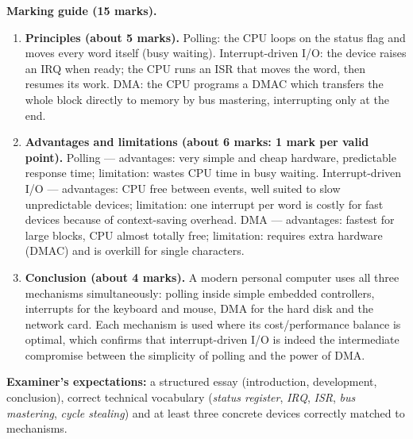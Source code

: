 \documentclass[11pt]{article}
\begin{document}
\begin{corrige}
\textbf{Marking guide (15 marks).}
\begin{enumerate}
\item \textbf{Principles (about 5 marks).} Polling: the CPU loops on the status flag and moves every word itself (busy waiting). Interrupt-driven I/O: the device raises an IRQ when ready; the CPU runs an ISR that moves the word, then resumes its work. DMA: the CPU programs a DMAC which transfers the whole block directly to memory by bus mastering, interrupting only at the end.
\item \textbf{Advantages and limitations (about 6 marks: 1 mark per valid point).} Polling --- advantages: very simple and cheap hardware, predictable response time; limitation: wastes CPU time in busy waiting. Interrupt-driven I/O --- advantages: CPU free between events, well suited to slow unpredictable devices; limitation: one interrupt per word is costly for fast devices because of context-saving overhead. DMA --- advantages: fastest for large blocks, CPU almost totally free; limitation: requires extra hardware (DMAC) and is overkill for single characters.
\item \textbf{Conclusion (about 4 marks).} A modern personal computer uses all three mechanisms simultaneously: polling inside simple embedded controllers, interrupts for the keyboard and mouse, DMA for the hard disk and the network card. Each mechanism is used where its cost/performance balance is optimal, which confirms that interrupt-driven I/O is indeed the intermediate compromise between the simplicity of polling and the power of DMA.
\end{enumerate}
\textbf{Examiner's expectations:} a structured essay (introduction, development, conclusion), correct technical vocabulary (\emph{status register}, \emph{IRQ}, \emph{ISR}, \emph{bus mastering}, \emph{cycle stealing}) and at least three concrete devices correctly matched to mechanisms.
\end{corrige}
\end{document}
